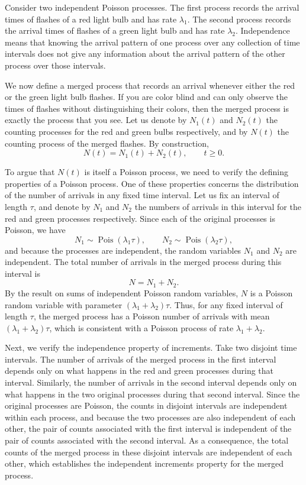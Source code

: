 Consider two independent Poisson processes.  
The first process records the arrival times of flashes of a red light bulb and has rate \(\lambda_1\).  
The second process records the arrival times of flashes of a green light bulb and has rate \(\lambda_2\).  
Independence means that knowing the arrival pattern of one process over any collection of time intervals does not give any information about the arrival pattern of the other process over those intervals.  

We now define a merged process that records an arrival whenever either the red or the green light bulb flashes.  
If you are color blind and can only observe the times of flashes without distinguishing their colors, then the merged process is exactly the process that you see.  
Let us denote by \(N_1(t)\) and \(N_2(t)\) the counting processes for the red and green bulbs respectively, and by \(N(t)\) the counting process of the merged flashes.  
By construction,
\[
N(t) = N_1(t) + N_2(t), \qquad t \ge 0.
\]

To argue that \(N(t)\) is itself a Poisson process, we need to verify the defining properties of a Poisson process.  
One of these properties concerns the distribution of the number of arrivals in any fixed time interval.  
Let us fix an interval of length \(\tau\), and denote by \(N_1\) and \(N_2\) the numbers of arrivals in this interval for the red and green processes respectively.  
Since each of the original processes is Poisson, we have
\[
N_1 \sim \operatorname{Pois}(\lambda_1 \tau),
\qquad
N_2 \sim \operatorname{Pois}(\lambda_2 \tau),
\]
and because the processes are independent, the random variables \(N_1\) and \(N_2\) are independent.  
The total number of arrivals in the merged process during this interval is
\[
N = N_1 + N_2.
\]
By the result on sums of independent Poisson random variables, \(N\) is a Poisson random variable with parameter \((\lambda_1 + \lambda_2)\tau\).  
Thus, for any fixed interval of length \(\tau\), the merged process has a Poisson number of arrivals with mean \((\lambda_1 + \lambda_2)\tau\), which is consistent with a Poisson process of rate \(\lambda_1 + \lambda_2\).

Next, we verify the independence property of increments.  
Take two disjoint time intervals.  
The number of arrivals of the merged process in the first interval depends only on what happens in the red and green processes during that interval.  
Similarly, the number of arrivals in the second interval depends only on what happens in the two original processes during that second interval.  
Since the original processes are Poisson, the counts in disjoint intervals are independent within each process, and because the two processes are also independent of each other, the pair of counts associated with the first interval is independent of the pair of counts associated with the second interval.  
As a consequence, the total counts of the merged process in these disjoint intervals are independent of each other, which establishes the independent increments property for the merged process.

